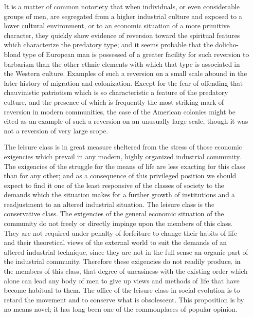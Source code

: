 \documentclass[12pt]{report}
\begin{document}
It is a matter of common notoriety that when individuals, or even
considerable groups of men, are segregated from a higher industrial
culture and exposed to a lower cultural environment, or to an economic
situation of a more primitive character, they quickly show evidence of
reversion toward the spiritual features which characterize the predatory
type; and it seems probable that the dolicho-blond type of European man
is possessed of a greater facility for such reversion to barbarism than
the other ethnic elements with which that type is associated in the
Western culture. Examples of such a reversion on a small scale abound in
the later history of migration and colonization. Except for the fear
of offending that chauvinistic patriotism which is so characteristic
a feature of the predatory culture, and the presence of which is
frequently the most striking mark of reversion in modern communities,
the case of the American colonies might be cited as an example of such a
reversion on an unusually large scale, though it was not a reversion of
very large scope.

The leisure class is in great measure sheltered from the stress of
those economic exigencies which prevail in any modern, highly organized
industrial community. The exigencies of the struggle for the means
of life are less exacting for this class than for any other; and as a
consequence of this privileged position we should expect to find it one
of the least responsive of the classes of society to the demands
which the situation makes for a further growth of institutions and a
readjustment to an altered industrial situation. The leisure class is
the conservative class. The exigencies of the general economic situation
of the community do not freely or directly impinge upon the members of
this class. They are not required under penalty of forfeiture to change
their habits of life and their theoretical views of the external world
to suit the demands of an altered industrial technique, since they
are not in the full sense an organic part of the industrial community.
Therefore these exigencies do not readily produce, in the members of
this class, that degree of uneasiness with the existing order which
alone can lead any body of men to give up views and methods of life that
have become habitual to them. The office of the leisure class in social
evolution is to retard the movement and to conserve what is obsolescent.
This proposition is by no means novel; it has long been one of the
commonplaces of popular opinion.
\end{document}
